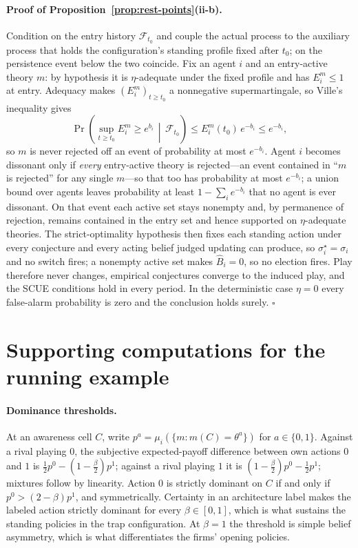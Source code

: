 \documentclass[11pt]{article}
\theoremstyle{definition}
\begin{document}
\paragraph{Proof of Proposition~\ref{prop:rest-points}(ii-b).}
Condition on the entry history $\mathcal F_{t_0}$ and couple the actual process to the auxiliary process that holds the configuration's standing profile fixed after $t_0$; on the persistence event below the two coincide.
Fix an agent $i$ and an entry-active theory $m$: by hypothesis it is $\eta$-adequate under the fixed profile and has $E_i^{m}\le1$ at entry.
Adequacy makes $(E_i^{m})_{t\ge t_0}$ a nonnegative supermartingale, so Ville's inequality gives
\[
\Pr\!\left(\sup_{t\ge t_0}E_i^{m}\ge e^{b_i}\,\middle|\,\mathcal F_{t_0}\right)
\le E_i^{m}(t_0)\,e^{-b_i}\le e^{-b_i},
\]
so $m$ is never rejected off an event of probability at most $e^{-b_i}$.
Agent $i$ becomes dissonant only if \emph{every} entry-active theory is rejected---an event contained in ``$m$ is rejected'' for any single $m$---so that too has probability at most $e^{-b_i}$; a union bound over agents leaves probability at least $1-\sum_i e^{-b_i}$ that no agent is ever dissonant.
On that event each active set stays nonempty and, by permanence of rejection, remains contained in the entry set and hence supported on $\eta$-adequate theories.
The strict-optimality hypothesis then fixes each standing action under every conjecture and every acting belief judged updating can produce, so $\sigma_i^{\star}=\sigma_i$ and no switch fires; a nonempty active set makes $\widehat B_i=0$, so no election fires.
Play therefore never changes, empirical conjectures converge to the induced play, and the SCUE conditions hold in every period.
In the deterministic case $\eta=0$ every false-alarm probability is zero and the conclusion holds surely.
\hfill$\square$

\section{Supporting computations for the running example}
\label{app:example}

\paragraph{Dominance thresholds.}
At an awareness cell $C$, write $p^a=\mu_i(\{m:m(C)=\theta^a\})$ for $a\in\{0,1\}$.
Against a rival playing $0$, the subjective expected-payoff difference between own actions $0$ and $1$ is $\tfrac12p^0-(1-\tfrac{\beta}{2})p^1$; against a rival playing $1$ it is $(1-\tfrac{\beta}{2})p^0-\tfrac12p^1$; mixtures follow by linearity.
Action $0$ is strictly dominant on $C$ if and only if $p^0>(2-\beta)p^1$, and symmetrically.
Certainty in an architecture label makes the labeled action strictly dominant for every $\beta\in[0,1]$, which is what sustains the standing policies in the trap configuration.
At $\beta=1$ the threshold is simple belief asymmetry, which is what differentiates the firms' opening policies.
\end{document}
